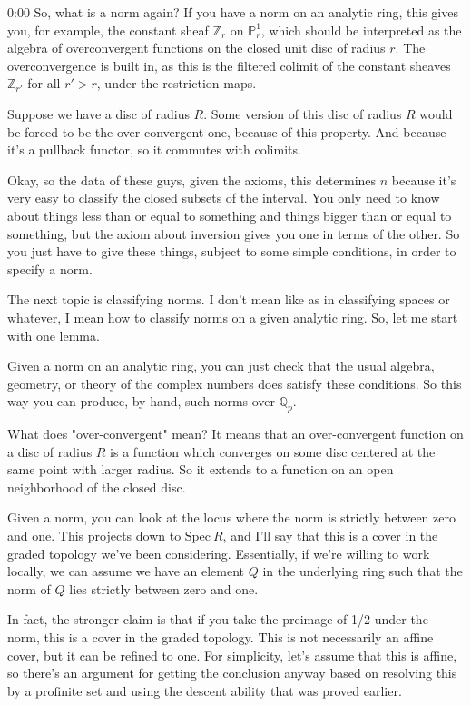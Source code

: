 \begin{unfinished}{0:00}
So, what is a norm again? If you have a norm on an analytic ring, this gives you, for example, the constant sheaf $\mathbb{Z}_{r}$ on $\mathbb{P}^1_r$, which should be interpreted as the algebra of overconvergent functions on the closed unit disc of radius $r$. The overconvergence is built in, as this is the filtered colimit of the constant sheaves $\mathbb{Z}_{r'}$ for all $r' > r$, under the restriction maps.



Suppose we have a disc of radius $R$. Some version of this disc of radius $R$ would be forced to be the over-convergent one, because of this property. And because it's a pullback functor, so it commutes with colimits.

Okay, so the data of these guys, given the axioms, this determines $n$ because it's very easy to classify the closed subsets of the interval. You only need to know about things less than or equal to something and things bigger than or equal to something, but the axiom about inversion gives you one in terms of the other. So you just have to give these things, subject to some simple conditions, in order to specify a norm.

The next topic is classifying norms. I don't mean like as in classifying spaces or whatever, I mean how to classify norms on a given analytic ring. So, let me start with one lemma.

Given a norm on an analytic ring, you can just check that the usual algebra, geometry, or theory of the complex numbers does satisfy these conditions. So this way you can produce, by hand, such norms over $\mathbb{Q}_p$.

What does "over-convergent" mean? It means that an over-convergent function on a disc of radius $R$ is a function which converges on some disc centered at the same point with larger radius. So it extends to a function on an open neighborhood of the closed disc.

Given a norm, you can look at the locus where the norm is strictly between zero and one. This projects down to $\mathrm{Spec}\ R$, and I'll say that this is a cover in the graded topology we've been considering. Essentially, if we're willing to work locally, we can assume we have an element $Q$ in the underlying ring such that the norm of $Q$ lies strictly between zero and one.

In fact, the stronger claim is that if you take the preimage of 1/2 under the norm, this is a cover in the graded topology. This is not necessarily an affine cover, but it can be refined to one. For simplicity, let's assume that this is affine, so there's an argument for getting the conclusion anyway based on resolving this by a profinite set and using the descent ability that was proved earlier.


\end{unfinished}
